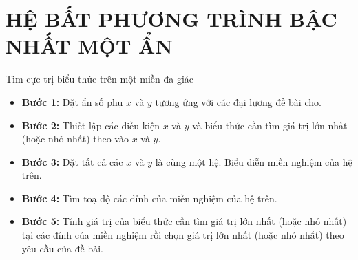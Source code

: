 \setcounter{ex}{0}
\section{HỆ BẤT PHƯƠNG TRÌNH BẬC NHẤT MỘT ẨN}
    Tìm cực trị biểu thức  trên một miền đa giác
    \begin{itemize}
        \item \textbf{Bước 1:} Đặt ẩn số phụ $x$ và $y$ tương ứng với các đại lượng đề bài cho.
        \item \textbf{Bước 2:} Thiết lập các điều kiện $x$ và $y$ và biểu thức cần tìm giá trị lớn nhất (hoặc nhỏ nhất) theo vào $x$ và $y$.
        \item \textbf{Bước 3:} Đặt tất cả các $x$ và $y$ là cùng một hệ. Biểu diễn miền nghiệm của hệ trên.
        \item \textbf{Bước 4:} Tìm toạ độ các đỉnh của miền nghiệm của hệ trên.
        \item \textbf{Bước 5:} Tính giá trị của biểu thức cần tìm giá trị lớn nhất (hoặc nhỏ nhất) tại các đỉnh của miền nghiệm rồi chọn giá trị lớn nhất (hoặc nhỏ nhất) theo yêu cầu của đề bài.
    \end{itemize}

